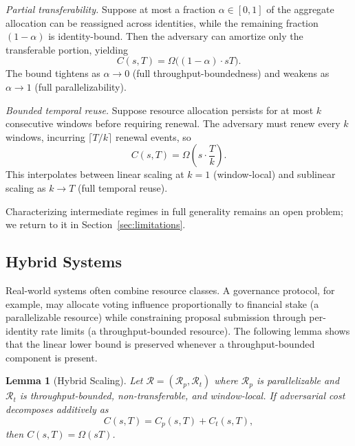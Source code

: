\documentclass[10pt,journal,compsoc]{IEEEtran}
\newtheorem{lemma}[theorem]{Lemma}
\theoremstyle{remark}
\begin{document}
	\emph{Partial transferability.}
	Suppose at most a fraction $\alpha \in [0,1]$ of the
	aggregate allocation can be reassigned across identities,
	while the remaining fraction $(1-\alpha)$ is
	identity-bound.
	Then the adversary can amortize only the transferable
	portion, yielding
	\begin{equation}
		C(s,T) = \Omega\bigl((1-\alpha) \cdot sT\bigr).
	\end{equation}
	The bound tightens as $\alpha \to 0$ (full
	throughput-boundedness) and weakens as $\alpha \to 1$
	(full parallelizability).
	
	\emph{Bounded temporal reuse.}
	Suppose resource allocation persists for at most
	$k$ consecutive windows before requiring renewal.
	The adversary must renew every $k$ windows, incurring
	$\lceil T/k \rceil$ renewal events, so
	\begin{equation}
		C(s,T) = \Omega\!\left(s \cdot \frac{T}{k}\right).
	\end{equation}
	This interpolates between linear scaling at $k=1$
	(window-local) and sublinear scaling as $k \to T$
	(full temporal reuse).
	
	Characterizing intermediate regimes in full generality
	remains an open problem; we return to it in
	Section~\ref{sec:limitations}.
	
	\subsection{Hybrid Systems}
	\label{ssec:hybrid}
	
	Real-world systems often combine resource classes.
	A governance protocol, for example, may allocate
	voting influence proportionally to financial stake
	(a parallelizable resource) while constraining
	proposal submission through per-identity rate limits
	(a throughput-bounded resource).
	The following lemma shows that the linear lower bound
	is preserved whenever a throughput-bounded component
	is present.
	
	\begin{lemma}[Hybrid Scaling]
		\label{lem:hybrid}
		Let $\mathcal{R} = (\mathcal{R}_p, \mathcal{R}_t)$
		where $\mathcal{R}_p$ is parallelizable and
		$\mathcal{R}_t$ is throughput-bounded,
		non-transferable, and window-local.
		If adversarial cost decomposes additively as
		\begin{equation}
			C(s,T) = C_p(s,T) + C_t(s,T),
		\end{equation}
		then $C(s,T) = \Omega(sT)$.
	\end{lemma}
	
\end{document}
